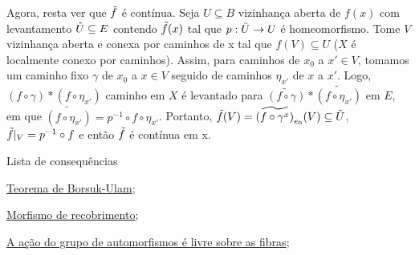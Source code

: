 \begin{dem}
    Agora, resta ver que $\Tilde{f}$ é contínua. Seja $U \subseteq B$ vizinhança aberta de $f(x)$ com levantamento $\Tilde{U} \subseteq E$ contendo $\Tilde{f}(x)$ tal que $p: \Tilde{U} \rightarrow U$ é homeomorfismo. Tome $V$ vizinhança aberta e conexa por caminhos de x tal que $f(V) \subseteq U$ ($X$ é localmente conexo por caminhos). Assim, para caminhos de $x_0$ a $x' \in V$, tomamos um caminho fixo $\gamma$ de $x_0$ a $x \in V$ seguido de caminhos $\eta_{x'}$ de $x$ a $x'$. Logo, $(f \circ \gamma) \ast (f \circ \eta_{x'})$ caminho em $X$ é levantado para $\widetilde{(f \circ \gamma)} \ast \widetilde{(f \circ \eta_{x'})}$ em $E$, em que $\widetilde{(f \circ \eta_{x'})} = p^{-1} \circ f \circ  \eta_{x'}$. Portanto, $\Tilde{f}(V) = \widetilde{(f \circ \gamma^{x})}_{e_0} (V) \subseteq \Tilde{U}$, $\Tilde{f}|_V = p^{-1} \circ f$ e então $\Tilde{f}$ é contínua em x.
     
\end{dem}
\begin{titlemize}{Lista de consequências}
	\item \hyperref[teo-borsuk-ulam-prop]{Teorema de Borsuk-Ulam};\\ %
 	\item \hyperref[morfismo-de-recobrimento-def]{Morfismo de recobrimento};\\
    	\item \hyperref[acao-de-automorfismos-e-livre-prop]{A ação do grupo de automorfismos é livre sobre as fibras};
\end{titlemize}

